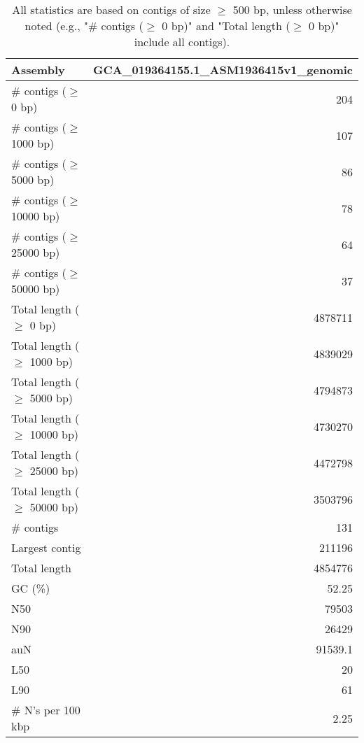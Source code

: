 \documentclass[12pt,a4paper]{article}
\begin{document}
\begin{table}[ht]
\begin{center}
\caption{All statistics are based on contigs of size $\geq$ 500 bp, unless otherwise noted (e.g., "\# contigs ($\geq$ 0 bp)" and "Total length ($\geq$ 0 bp)" include all contigs).}
\begin{tabular}{|l*{1}{|r}|}
\hline
Assembly & GCA\_019364155.1\_ASM1936415v1\_genomic \\ \hline
\# contigs ($\geq$ 0 bp) & 204 \\ \hline
\# contigs ($\geq$ 1000 bp) & 107 \\ \hline
\# contigs ($\geq$ 5000 bp) & 86 \\ \hline
\# contigs ($\geq$ 10000 bp) & 78 \\ \hline
\# contigs ($\geq$ 25000 bp) & 64 \\ \hline
\# contigs ($\geq$ 50000 bp) & 37 \\ \hline
Total length ($\geq$ 0 bp) & 4878711 \\ \hline
Total length ($\geq$ 1000 bp) & 4839029 \\ \hline
Total length ($\geq$ 5000 bp) & 4794873 \\ \hline
Total length ($\geq$ 10000 bp) & 4730270 \\ \hline
Total length ($\geq$ 25000 bp) & 4472798 \\ \hline
Total length ($\geq$ 50000 bp) & 3503796 \\ \hline
\# contigs & 131 \\ \hline
Largest contig & 211196 \\ \hline
Total length & 4854776 \\ \hline
GC (\%) & 52.25 \\ \hline
N50 & 79503 \\ \hline
N90 & 26429 \\ \hline
auN & 91539.1 \\ \hline
L50 & 20 \\ \hline
L90 & 61 \\ \hline
\# N's per 100 kbp & 2.25 \\ \hline
\end{tabular}
\end{center}
\end{table}
\end{document}
